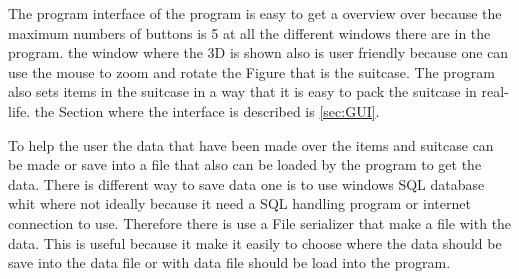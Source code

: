 The program interface of the program is easy to get a overview over because the maximum numbers of buttons is 5 at all the different windows there are in the program. the window where the 3D is shown also is user friendly because one can use the mouse to zoom and rotate the Figure that is the suitcase. The program also sets items in the suitcase in a way that it is easy to pack the suitcase in real-life. the Section where the interface is described is \ref{sec:GUI}.

To help the user the data that have been made over the items and suitcase can be made or save into a file that also can be loaded by the program to get the data. There is different way to save data one is to use windows SQL database whit where not ideally because it need a SQL handling program or internet connection to use. Therefore there is use a File serializer that make a file with the data. This is useful because it make it easily to choose where the data should be save into the data file or with data file should be load into the program.